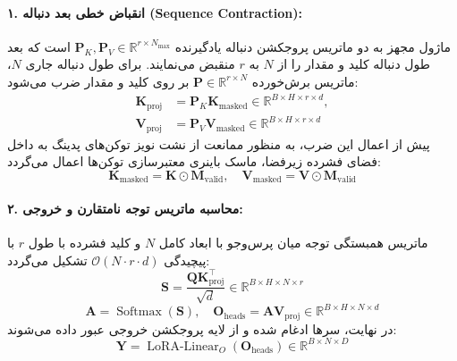 \paragraph{۱. انقباض خطی بعد دنباله (Sequence Contraction):}
ماژول مجهز به دو ماتریس پروجکشن دنباله یادگیرنده $\mathbf{P}_K, \mathbf{P}_V \in \mathbb{R}^{r \times N_{\text{max}}}$ است که بعد طول دنباله کلید و مقدار را از $N$ به $r$ منقبض می‌نمایند. برای طول دنباله جاری $N$، ماتریس برش‌خورده $\mathbf{P} \in \mathbb{R}^{r \times N}$ بر روی کلید و مقدار ضرب می‌شود:
\begin{align}
\mathbf{K}_{\text{proj}} &= \mathbf{P}_K \mathbf{K}_{\text{masked}} \in \mathbb{R}^{B \times H \times r \times d}, \\
\mathbf{V}_{\text{proj}} &= \mathbf{P}_V \mathbf{V}_{\text{masked}} \in \mathbb{R}^{B \times H \times r \times d}
\end{align}
پیش از اعمال این ضرب، به منظور ممانعت از نشت نویز توکن‌های پدینگ به داخل فضای فشرده زیرفضا، ماسک باینری معتبرسازی توکن‌ها اعمال می‌گردد:
\begin{equation}
\mathbf{K}_{\text{masked}} = \mathbf{K} \odot \mathbf{M}_{\text{valid}}, \quad \mathbf{V}_{\text{masked}} = \mathbf{V} \odot \mathbf{M}_{\text{valid}}
\end{equation}

\paragraph{۲. محاسبه ماتریس توجه نامتقارن و خروجی:}
ماتریس همبستگی توجه میان پرس‌وجو با ابعاد کامل $N$ و کلید فشرده با طول $r$ با پیچیدگی $\mathcal{O}(N \cdot r \cdot d)$ تشکیل می‌گردد:
\begin{equation}
\mathbf{S} = \frac{\mathbf{Q} \mathbf{K}_{\text{proj}}^\top}{\sqrt{d}} \in \mathbb{R}^{B \times H \times N \times r}
\end{equation}
\begin{equation}
\mathbf{A} = \operatorname{Softmax}(\mathbf{S}), \quad \mathbf{O}_{\text{heads}} = \mathbf{A} \mathbf{V}_{\text{proj}} \in \mathbb{R}^{B \times H \times N \times d}
\end{equation}
در نهایت، سرها ادغام شده و از لایه پروجکشن خروجی عبور داده می‌شوند:
\begin{equation}
\mathbf{Y} = \operatorname{LoRA-Linear}_O(\mathbf{O}_{\text{heads}}) \in \mathbb{R}^{B \times N \times D}
\end{equation}

